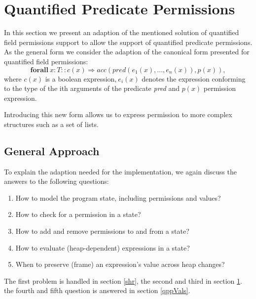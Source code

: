 \documentclass[12pt]{article}
\begin{document}
\section{Quantified Predicate Permissions}
\label{qpp}
In this section we present an adaption of the mentioned solution of quantified field permissions support to allow the support of quantified predicate permissions. 
As the general form we consider the adaption of the canonical form presented for quantified field permissions: 
\begin{equation}
 \mathbf{forall} \   x:T :: c(x) \Rightarrow acc(pred(e_1 (x),…,e_n (x)), p(x)), 
\end{equation}
where \(c(x)\) is a boolean expression,\(\ e_i(x)\) denotes the expression conforming to the type of the ith arguments of the predicate \textit{pred} and \(p(x)\) permission expression.

Introducing this new form allows us to express permission to more complex structures such as a set of lists.

\subsection{General Approach}
To explain the adaption needed for the implementation, we again discuss the answers to the following questions:
\begin{enumerate}
\item How to model the program state, including permissions and values?
\item How to check for a permission in a state?
\item How to add and remove permissions to and from a state?
\item How to evaluate (heap-dependent) expressions in a state?
\item When to preserve (frame) an expression's value across heap changes?
\end{enumerate}

The first problem is handled in section \ref{shr}, the second and third in section \ref{qpp}. the fourth and fifth question is answered  in section \ref{qppVals}. 
\end{document}
